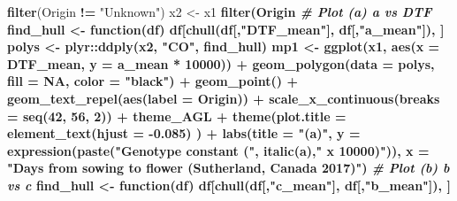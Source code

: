 \documentclass[
]{article}
\newenvironment{Shaded}{\begin{snugshade}}{\end{snugshade}}
\newcommand{\CommentTok}[1]{\textcolor[rgb]{0.56,0.35,0.01}{\textit{#1}}}
\newcommand{\ControlFlowTok}[1]{\textcolor[rgb]{0.13,0.29,0.53}{\textbf{#1}}}
\newcommand{\DataTypeTok}[1]{\textcolor[rgb]{0.13,0.29,0.53}{#1}}
\newcommand{\DecValTok}[1]{\textcolor[rgb]{0.00,0.00,0.81}{#1}}
\newcommand{\FloatTok}[1]{\textcolor[rgb]{0.00,0.00,0.81}{#1}}
\newcommand{\KeywordTok}[1]{\textcolor[rgb]{0.13,0.29,0.53}{\textbf{#1}}}
\newcommand{\NormalTok}[1]{#1}
\newcommand{\OperatorTok}[1]{\textcolor[rgb]{0.81,0.36,0.00}{\textbf{#1}}}
\newcommand{\OtherTok}[1]{\textcolor[rgb]{0.56,0.35,0.01}{#1}}
\newcommand{\StringTok}[1]{\textcolor[rgb]{0.31,0.60,0.02}{#1}}
\begin{document}
\begin{Shaded}
\begin{Highlighting}[]
{{{{{{{{{{\StringTok{  }\KeywordTok{filter}\NormalTok{(Origin }\OperatorTok{!=}\StringTok{ "Unknown"}\NormalTok{)}
\NormalTok{x2 <-}\StringTok{ }\NormalTok{x1 }\OperatorTok{%
\StringTok{  }\KeywordTok{filter}\NormalTok{(Origin }\OperatorTok{%
\CommentTok{# Plot (a) a vs DTF}
\NormalTok{find_hull <-}\StringTok{ }\ControlFlowTok{function}\NormalTok{(df) df[}\KeywordTok{chull}\NormalTok{(df[,}\StringTok{"DTF_mean"}\NormalTok{], df[,}\StringTok{"a_mean"}\NormalTok{]), ]}
\NormalTok{polys <-}\StringTok{ }\NormalTok{plyr}\OperatorTok{::}\KeywordTok{ddply}\NormalTok{(x2, }\StringTok{"CO"}\NormalTok{, find_hull)}
\NormalTok{mp1 <-}\StringTok{ }\KeywordTok{ggplot}\NormalTok{(x1, }\KeywordTok{aes}\NormalTok{(}\DataTypeTok{x =}\NormalTok{ DTF_mean, }\DataTypeTok{y =}\NormalTok{ a_mean }\OperatorTok{*}\StringTok{ }\DecValTok{10000}\NormalTok{)) }\OperatorTok{+}\StringTok{ }
\StringTok{  }\KeywordTok{geom_polygon}\NormalTok{(}\DataTypeTok{data =}\NormalTok{ polys, }\DataTypeTok{fill =} \OtherTok{NA}\NormalTok{, }\DataTypeTok{color =} \StringTok{"black"}\NormalTok{) }\OperatorTok{+}
\StringTok{  }\KeywordTok{geom_point}\NormalTok{() }\OperatorTok{+}\StringTok{ }\KeywordTok{geom_text_repel}\NormalTok{(}\KeywordTok{aes}\NormalTok{(}\DataTypeTok{label =}\NormalTok{ Origin)) }\OperatorTok{+}
\StringTok{  }\KeywordTok{scale_x_continuous}\NormalTok{(}\DataTypeTok{breaks =} \KeywordTok{seq}\NormalTok{(}\DecValTok{42}\NormalTok{, }\DecValTok{56}\NormalTok{, }\DecValTok{2}\NormalTok{)) }\OperatorTok{+}\StringTok{ }
\StringTok{  }\NormalTok{theme_AGL }\OperatorTok{+}
\StringTok{  }\KeywordTok{theme}\NormalTok{(}\DataTypeTok{plot.title =} \KeywordTok{element_text}\NormalTok{(}\DataTypeTok{hjust =} \FloatTok{-0.085}\NormalTok{) ) }\OperatorTok{+}
\StringTok{  }\KeywordTok{labs}\NormalTok{(}\DataTypeTok{title =} \StringTok{"(a)"}\NormalTok{,}
       \DataTypeTok{y =} \KeywordTok{expression}\NormalTok{(}\KeywordTok{paste}\NormalTok{(}\StringTok{"Genotype constant ("}\NormalTok{, }\KeywordTok{italic}\NormalTok{(a),}\StringTok{" x 10000)"}\NormalTok{)), }
       \DataTypeTok{x =} \StringTok{"Days from sowing to flower (Sutherland, Canada 2017)"}\NormalTok{)}
\CommentTok{# Plot (b) b vs c}
\NormalTok{find_hull <-}\StringTok{ }\ControlFlowTok{function}\NormalTok{(df) df[}\KeywordTok{chull}\NormalTok{(df[,}\StringTok{"c_mean"}\NormalTok{], df[,}\StringTok{"b_mean"}\NormalTok{]), ]}
}}}}}}}}}}}}
\end{Highlighting}
\end{Shaded}
\end{document}
